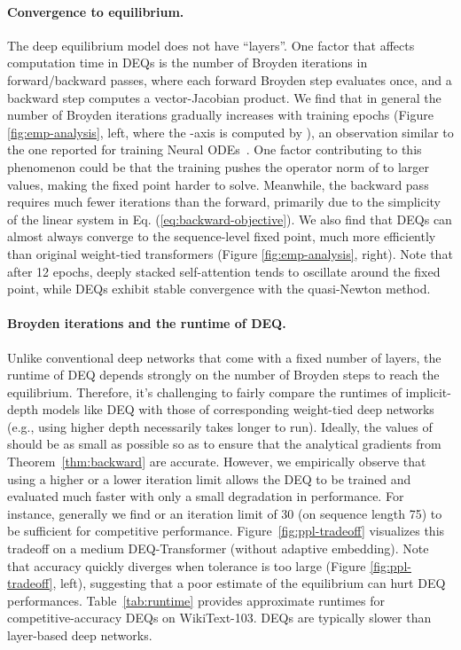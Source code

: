 \documentclass{article}
\begin{document}
\vspace{-2mm}
\paragraph{Convergence to equilibrium.} The deep equilibrium model does not have ``layers''. One factor that affects computation time in DEQs is the number of Broyden iterations in forward/backward passes, where each forward Broyden step evaluates  once, and a backward step computes a vector-Jacobian product. We find that in general the number of Broyden iterations gradually increases with training epochs (Figure \ref{fig:emp-analysis}, left, where the -axis is computed by ), an observation similar to the one reported for training Neural ODEs~\citep{chen2018neural}. One factor contributing to this phenomenon could be that the training pushes the operator norm of  to larger values, making the fixed point harder to solve. Meanwhile, the backward pass requires much fewer iterations than the forward, primarily due to the simplicity of the linear system in Eq. (\ref{eq:backward-objective}). We also find that DEQs can almost always converge to the sequence-level fixed point, much more efficiently than original weight-tied transformers (Figure \ref{fig:emp-analysis}, right). Note that after 12 epochs, deeply stacked self-attention tends to oscillate around the fixed point, while DEQs exhibit stable convergence with the quasi-Newton method.

\vspace{-2mm}
\paragraph{Broyden iterations and the runtime of DEQ.} Unlike conventional deep networks that come with a fixed number  of layers, the runtime of DEQ depends strongly on the number of Broyden steps to reach the equilibrium. Therefore, it's challenging to fairly compare the runtimes of implicit-depth models like DEQ with those of corresponding weight-tied deep networks (e.g., using higher depth necessarily takes longer to run). Ideally, the values of  should be as small as possible so as to ensure that the analytical gradients from Theorem~\ref{thm:backward} are accurate. However, we empirically observe that using a higher  or a lower iteration limit allows the DEQ to be trained and evaluated much faster with only a small degradation in performance. For instance, generally we find  or an iteration limit of 30 (on sequence length 75) to be sufficient for competitive performance. Figure~\ref{fig:ppl-tradeoff} visualizes this tradeoff on a medium DEQ-Transformer (without adaptive embedding). Note that accuracy quickly diverges when tolerance  is too large (Figure \ref{fig:ppl-tradeoff}, left), suggesting that a poor estimate of the equilibrium can hurt DEQ performances. Table~\ref{tab:runtime} provides approximate runtimes for competitive-accuracy DEQs on WikiText-103. DEQs are typically slower than layer-based deep networks.
\end{document}
